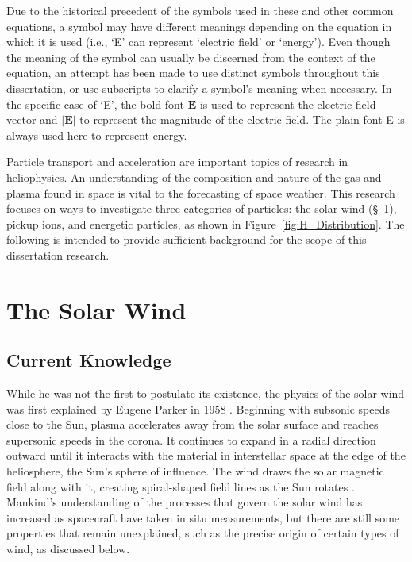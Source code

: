 Due to the historical precedent of the symbols used in these and other common equations, a symbol may have different meanings depending on the equation in which it is used (i.e., `E' can represent `electric field' or `energy'). Even though the meaning of the symbol can usually be discerned from the context of the equation, an attempt has been made to use distinct symbols throughout this dissertation, or use subscripts to clarify a symbol's meaning when necessary. In the specific case of `E', the bold font $\mathbf{E}$ is used to represent the electric field vector and $\left|\mathbf{E}\right|$  to represent the magnitude of the electric field. The plain font E is always used here to represent energy.

Particle transport and acceleration are important topics of research in heliophysics. An understanding of the composition and nature of the gas and plasma found in space is vital to the forecasting of space weather. This research focuses on ways to investigate three categories of particles: the solar wind (\S~\ref{Solar Wind}), pickup ions, and energetic particles, as shown in Figure~\ref{fig:H_Distribution}. The following is intended to provide sufficient background for the scope of this dissertation research.

\section{The Solar Wind}
\label{Solar Wind}

\subsection{Current Knowledge}
\label{SW Current Knowledge}
While he was not the first to postulate its existence, the physics of the solar wind was first explained by Eugene Parker in 1958 \citep{parker58}. Beginning with subsonic speeds close to the Sun, plasma accelerates away from the solar surface and reaches supersonic speeds in the corona. It continues to expand in a radial direction outward until it interacts with the material in interstellar space at the edge of the heliosphere, the Sun's sphere of influence. The wind draws the solar magnetic field along with it, creating spiral-shaped field lines as the Sun rotates \citep{parker59}. Mankind's understanding of the processes that govern the solar wind has increased as spacecraft have taken in situ measurements, but there are still some properties that remain unexplained, such as the precise origin of certain types of wind, as discussed below.

